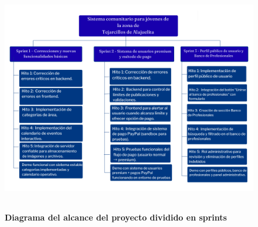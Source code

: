 
\begin{figure}[H]
  \centering
    \includegraphics[height= 10cm, width=15cm]{project/images/EDT1.png}
  \caption{\textbf{Diagrama del alcance del proyecto dividido en sprints}}
\end{figure}
